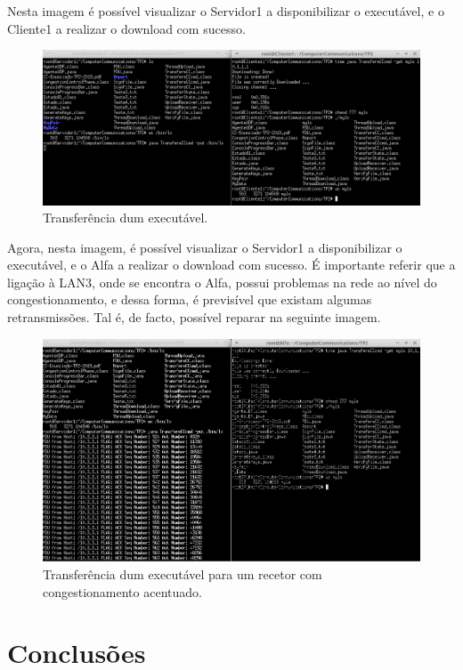 \documentclass{llncs}
\begin{document}
Nesta imagem é possível visualizar o Servidor1 a disponibilizar o executável, e o Cliente1 a realizar o download com sucesso.

\begin{figure}[H]
\begin{center}
\includegraphics[scale=0.4]{myls_cliente1.png}
\end{center}
\caption{Transferência dum executável.}
\end{figure}

Agora, nesta imagem, é possível visualizar o Servidor1 a disponibilizar o executável, e o Alfa a realizar o download com sucesso. É importante referir que a ligação à LAN3, onde se encontra o Alfa, possui problemas na rede ao nível do congestionamento, e dessa forma, é previsível que existam algumas retransmissões. Tal é, de facto, possível reparar na seguinte imagem.

\begin{figure}[H]
\begin{center}
\includegraphics[scale=0.4]{myls_alfa.png}
\end{center}
\caption{Transferência dum executável para um recetor com congestionamento acentuado.}
\end{figure}



\section{Conclusões}
\end{document}
